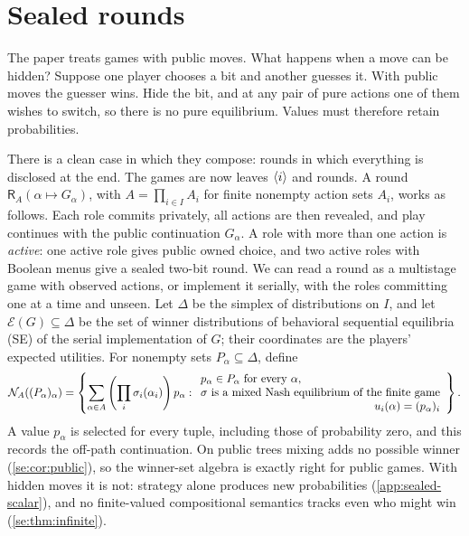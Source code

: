 \section{Sealed rounds}\label{app:sealed}

The paper treats games with public moves. What happens when a move can be hidden? Suppose one player chooses a bit and another guesses it. With public moves the guesser wins. Hide the bit, and at any pair of pure actions one of them wishes to switch, so there is no pure equilibrium. Values must therefore retain probabilities.

There is a clean case in which they compose: rounds in which everything is disclosed at the end. The games are now leaves $\langle i\rangle$ and rounds. A round $\mathsf R_A(\alpha\mapsto G_\alpha)$, with $A=\prod_{i\in I}A_i$ for finite nonempty action sets $A_i$, works as follows. Each role commits privately, all actions are then revealed, and play continues with the public continuation $G_\alpha$. A role with more than one action is \emph{active}: one active role gives public owned choice, and two active roles with Boolean menus give a sealed two-bit round. We can read a round as a multistage game with observed actions, or implement it serially, with the roles committing one at a time and unseen. Let $\Delta$ be the simplex of distributions on $I$, and let $\mathcal E(G)\subseteq\Delta$ be the set of winner distributions of behavioral sequential equilibria (SE) of the serial implementation of $G$; their coordinates are the players' expected utilities. For nonempty sets $P_\alpha\subseteq\Delta$, define
\begin{equation}\label{se:eq:round}
 \mathcal N_A((P_\alpha)_\alpha)=
 \left\{\sum_{\alpha\in A}\left(\prod_i\sigma_i(\alpha_i)\right)p_\alpha:
 \begin{array}{l}
 p_\alpha\in P_\alpha\text{ for every }\alpha,\\
 \sigma\text{ is a mixed Nash equilibrium of the finite game}\\
 \hfill u_i(\alpha)=(p_\alpha)_i
 \end{array}\right\}.
\end{equation}
A value $p_\alpha$ is selected for every tuple, including those of probability zero, and this records the off-path continuation. On public trees mixing adds no possible winner (\cref{se:cor:public}), so the winner-set algebra is exactly right for public games. With hidden moves it is not: strategy alone produces new probabilities (\cref{app:sealed-scalar}), and no finite-valued compositional semantics tracks even who might win (\cref{se:thm:infinite}).

